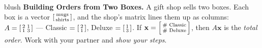 \documentclass[10pt]{article}
\newcommand{\xx}{\mathbf{x}}
\begin{document}

\vspace{0.10in}

\begin{headlinebox}{blush}
\small\textbf{Building Orders from Two Boxes.} A gift shop sells two boxes. Each box is a vector
$\begin{bsmallmatrix} \text{mugs} \\ \text{shirts} \end{bsmallmatrix}$, and the shop's matrix lines
them up as columns:
$A=\begin{bsmallmatrix} 2 & 1 \\ 1 & 3 \end{bsmallmatrix}$ ---
Classic $=\begin{bsmallmatrix} 2\\1 \end{bsmallmatrix}$, Deluxe $=\begin{bsmallmatrix} 1\\3 \end{bsmallmatrix}$.
If $\xx=\begin{bsmallmatrix} \text{\# Classic}\\ \text{\# Deluxe} \end{bsmallmatrix}$, then $A\xx$ is the
\emph{total order}. Work with your partner and \emph{show your steps}.
\end{headlinebox}

\vspace{0.10in}
\end{document}

